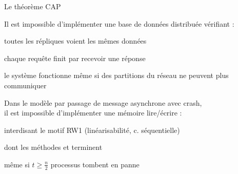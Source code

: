
\begingroup


\begin{frame}{Le théorème CAP}

   {
    Il est impossible d'implémenter une base de données distribuée vérifiant :
    \begin{description}
    \item[Consistency :] toutes les répliques voient les \alert{mêmes données}
    \item[Availability :] chaque requête \alert{finit par} recevoir une réponse
    \item[Partition tolerance :] le système fonctionne même si des \alert{partitions du réseau} ne peuvent plus communiquer
    \end{description}
  }

   {
      Dans le modèle par passage de message asynchrone avec crash, \\
      il est impossible d'implémenter une mémoire lire/écrire :
      \begin{description}
      \item[Consistency :] interdisant le motif RW1 (\alert{linéarisabilité}, \alert{c. séquentielle})
      \item[Availability :] dont les méthodes \Read et \Write \alert{terminent}
      \item[Partition tolerance :] même si \alert{$t\ge \frac{n}{2}$} processus tombent en panne
      \end{description}
  }


\end{frame}

\endgroup
\endinput
